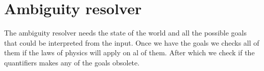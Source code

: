 
\section*{Ambiguity resolver}
The ambiguity resolver needs the state of the world and all the possible goals that could be interpreted from the input.
Once we have the goals we checks all of them if the laws of physics will apply on al of them.
After which we check if the quantifiers makes any of the goals obsolete.


